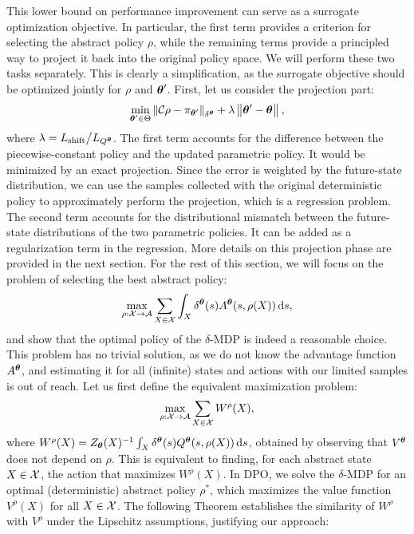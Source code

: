 This lower bound on performance improvement can serve as a surrogate optimization objective. In particular, the first term provides a criterion for selecting the abstract policy $\rho$, while the remaining terms provide a principled way to project it back into the original policy space. 
We will perform these two tasks separately. This is clearly a simplification, as the surrogate objective should be optimized jointly for $\rho$ and $\vtheta'$. 
First, let us consider the projection part: 
\begin{align}\label{eq:proj}
\min_{\vtheta'\in\Theta} \norm[\delta^{\vtheta}]{\Conc\rho - \pi_{\vtheta'}} 
+ \lambda\norm{\vtheta'-\vtheta},
\end{align}
where $\lambda=L_{\text{shift}}\big/L_{Q^{\vtheta}}$. The first term accounts for the difference between the piecewise-constant policy and the updated parametric policy. It would be minimized by an exact projection. Since the error is weighted by the future-state distribution, we can use the samples collected with the original deterministic policy to approximately perform the projection, which is a regression problem. The second term accounts for the distributional mismatch between the future-state distributions of the two parametric policies. It can be added as a regularization term in the regression. More details on this projection phase are provided in the next section.
%
For the rest of this section, we will focus on the problem of selecting the best abstract policy: 
%
\begin{align}
\max_{\rho:\Xspace\to\Aspace}\sum_{X\in\Xspace}\int_{X}\delta^{\vtheta}(s)A^{\vtheta}(s,\rho(X)) \de s,
\end{align}
%
and show that the optimal policy of the $\delta$-MDP is indeed a reasonable choice. This problem has no trivial solution, as we do not know the advantage function $A^{\vtheta}$, and estimating it for all (infinite) states and actions with our limited samples is out of reach. Let us first define the equivalent maximization problem:
\begin{align}\label{eq:W}
\max_{\rho:\Xspace\to\Aspace} \sum_{X\in\Xspace}W^{\rho}(X),
\end{align}
where $W^{\rho}(X) = Z_{\vtheta}(X)^{-1}\int_{X}\delta^{\vtheta}(s)Q^{\vtheta}(s,\rho(X))\de s$, obtained by observing that $V^{\vtheta}$ does not depend on $\rho$. This is equivalent to finding, for each abstract state $X\in\Xspace$, the action that maximizes $W^{\rho}(X)$. In DPO, we solve the $\delta$-MDP for an optimal (deterministic) abstract policy $\rho^{*}$, which maximizes the value function $V^{\rho}(X)$ for all $X\in\Xspace$. The following Theorem establishes the similarity of $W^{\rho}$ with $V^{\rho}$ under the Lipschitz assumptions, justifying our approach: 
